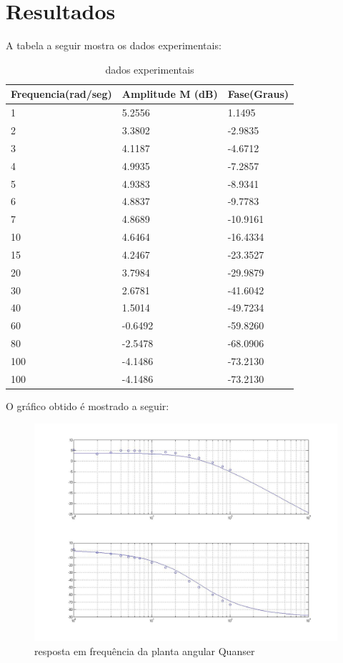 \documentclass[journal]{IEEEtran}
\begin{document}
\section{Resultados}
A tabela a seguir mostra os dados experimentais:
\FloatBarrier
\begin{table}[!htp]
 \centering
 \begin{tabular}{|l|l|l|}\hline
 Frequencia(rad/seg) &         Amplitude M (dB) &      Fase(Graus) \\ 
\hline 
 		 1 &  5.2556 &  1.1495 \\ \hline 
		 2 &  3.3802 &  -2.9835 \\ \hline 
		 3 &  4.1187 &  -4.6712 \\ \hline 
		 4 &  4.9935 &  -7.2857 \\ \hline 
		 5 &  4.9383 &  -8.9341 \\ \hline 
		 6 &  4.8837 &  -9.7783 \\ \hline 
		 7 &  4.8689 &  -10.9161 \\ \hline 
		 10 &  4.6464 &  -16.4334 \\ \hline 
		 15 &  4.2467 &  -23.3527 \\ \hline 
		 20 &  3.7984 &  -29.9879 \\ \hline 
		 30 &  2.6781 &  -41.6042 \\ \hline 
		 40 &  1.5014 &  -49.7234 \\ \hline 
		 60 &  -0.6492 &  -59.8260 \\ \hline 
		 80 &  -2.5478 &  -68.0906 \\ \hline 
		 100 &  -4.1486 &  -73.2130 \\ \hline 
		 100 &  -4.1486 &  -73.2130 \\ \hline 
 \end{tabular}
  \caption{dados experimentais}
\end{table}
\FloatBarrier

O gráfico obtido é mostrado a seguir:
\FloatBarrier
\begin{figure}[!htp]
   \includegraphics[scale=0.2]{../images/exp5_plot.jpg}
    \caption{resposta em frequência da planta angular Quanser}
    \label{fig:step}
\end{figure}
\FloatBarrier
\end{document}
